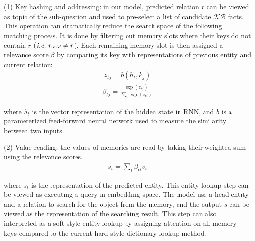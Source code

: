 (1) Key hashing and addressing: in our model, predicted relation $r$ can be viewed as topic of the sub-question and used to pre-select a list of candidate $\mathcal{KB}$ facts. This operation can dramatically reduce the search space of the following matching process. It is done by filtering out memory slots where their keys do not contain $r$ ($\emph{i.e.}\ r_{mid}\neq r$). Each remaining memory slot is then assigned a relevance score $\beta$ by comparing its key with representations of previous entity and current relation: %
\begin{align}
z_{tj} = b(h_t, k_j)
\end{align}
\vspace{-3ex}
\begin{align}
\beta_{tj} = \frac{\exp (z_{tj})}{\sum_i\exp (z_{ti})}
\end{align}

where $h_t$ is the vector representation of the hidden state in RNN, and $b$ is a parameterized feed-forward neural network used to measure the similarity between two inputs. 

(2) Value reading: the values of memories are read by taking their weighted sum using the relevance scores.
\begin{align}
s_t =\sum_{i}\beta_{ti}v_i
\end{align}

where $s_t$ is the representation of the predicted entity. This entity lookup step can be viewed as executing a query in embedding space. The model use a head entity and a relation to search for the object from the memory, and the output $s$ can be viewed as the representation of the searching result. This step can also interpreted as a soft style entity lookup by assigning attention on all memory keys compared to the current hard style dictionary lookup method.